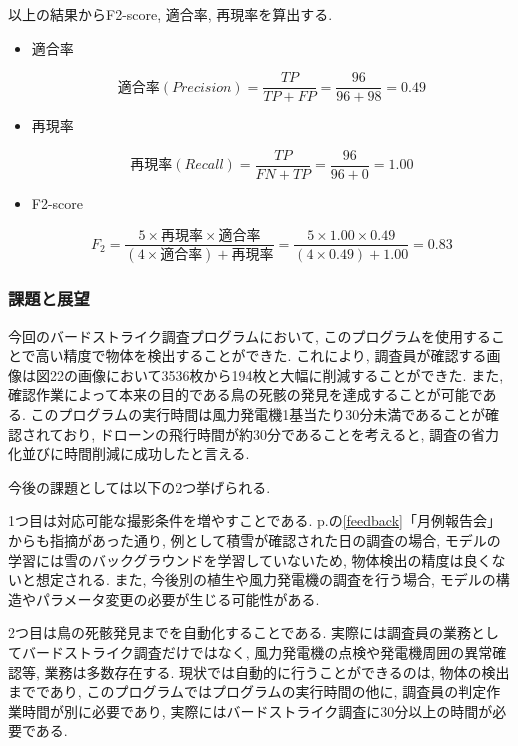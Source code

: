 \documentclass[dvipdfmx]{jsarticle}
\begin{document}
以上の結果からF2-score, 適合率, 再現率を算出する.
\begin{itemize}
    
    \item 適合率

    \begin{equation}
        適合率(Precision) = \frac{TP}{TP+FP} = \frac{96}{96+98} = 0.49
    \end{equation}
    \item 再現率

    \begin{equation}
        再現率(Recall) = \frac{TP}{FN+TP} = \frac{96}{96+0} = 1.00
    \end{equation}
    \item F2-score

    \begin{equation}
        F_{2} = \frac{5 \times 再現率 \times 適合率}{(4 \times 適合率)+再現率} = 
        \frac{5 \times 1.00 \times 0.49}{(4 \times 0.49)+1.00} = 0.83
    \end{equation}
\end{itemize}


\subsubsection{課題と展望}
今回のバードストライク調査プログラムにおいて, このプログラムを使用することで高い精度で物体を検出することができた.
これにより, 調査員が確認する画像は図22の画像において3536枚から194枚と大幅に削減することができた.
また, 確認作業によって本来の目的である鳥の死骸の発見を達成することが可能である.
このプログラムの実行時間は風力発電機1基当たり30分未満であることが確認されており, ドローンの飛行時間が約30分であることを考えると, 調査の省力化並びに時間削減に成功したと言える.

今後の課題としては以下の2つ挙げられる.

1つ目は対応可能な撮影条件を増やすことである.
p.\pageref{feedback}の\ref{feedback}「月例報告会」からも指摘があった通り, 例として積雪が確認された日の調査の場合, モデルの学習には雪のバックグラウンドを学習していないため, 物体検出の精度は良くないと想定される.
また, 今後別の植生や風力発電機の調査を行う場合, モデルの構造やパラメータ変更の必要が生じる可能性がある.

2つ目は鳥の死骸発見までを自動化することである.
実際には調査員の業務としてバードストライク調査だけではなく, 風力発電機の点検や発電機周囲の異常確認等, 業務は多数存在する.
現状では自動的に行うことができるのは, 物体の検出までであり, このプログラムではプログラムの実行時間の他に, 調査員の判定作業時間が別に必要であり, 実際にはバードストライク調査に30分以上の時間が必要である.
\end{document}
